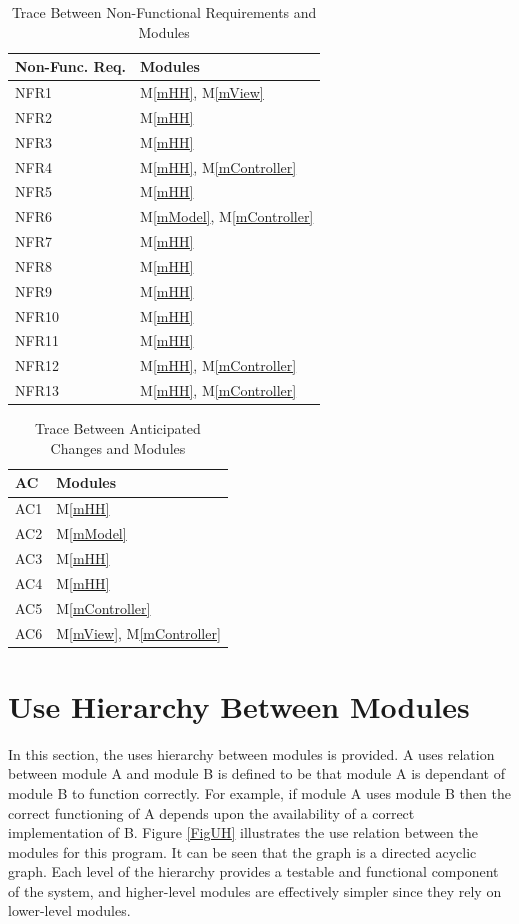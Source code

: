\documentclass[12pt, titlepage]{article}
\newcommand{\mref}[1]{M\ref{#1}}
\begin{document}
\begin{table}[H]
\centering
\begin{tabular}{p{} p{}}
\toprule
\textbf{Non-Func. Req.} & \textbf{Modules}\\
\midrule
NFR1 & \mref{mHH}, \mref{mView}\\
NFR2 & \mref{mHH}\\
NFR3 & \mref{mHH}\\
NFR4 & \mref{mHH}, \mref{mController}\\
NFR5 & \mref{mHH}\\
NFR6 & \mref{mModel}, \mref{mController}\\
NFR7 & \mref{mHH}\\
NFR8 & \mref{mHH}\\
NFR9 & \mref{mHH}\\
NFR10 & \mref{mHH}\\
NFR11 & \mref{mHH}\\
NFR12 & \mref{mHH}, \mref{mController}\\
NFR13 & \mref{mHH}, \mref{mController}\\
\bottomrule
\end{tabular}
\caption{Trace Between Non-Functional Requirements and Modules}
\label{TblRT}
\end{table}

\begin{table}[H]
\centering
\begin{tabular}{p{} p{}}
\toprule
\textbf{AC} & \textbf{Modules}\\
\midrule
AC1 & \mref{mHH}\\
AC2 & \mref{mModel}\\
AC3 & \mref{mHH}\\
AC4 & \mref{mHH}\\
AC5 & \mref{mController}\\
AC6 & \mref{mView}, \mref{mController}\\
\bottomrule
\end{tabular}
\caption{Trace Between Anticipated Changes and Modules}
\label{TblACT}
\end{table}

\section{Use Hierarchy Between Modules} \label{SecUse}

In this section, the uses hierarchy between modules is
provided. A uses relation between module A and module B is defined to be that module A is dependant of module B to function correctly. For example, if module A uses module B then the correct functioning of A depends upon the availability of a correct
implementation of B. Figure \ref{FigUH} illustrates the use relation between
the modules for this program. It can be seen that the graph is a directed acyclic graph. Each level of the hierarchy provides a testable and functional component of the system, and higher-level modules are effectively simpler since they rely on lower-level modules.
\end{document}
